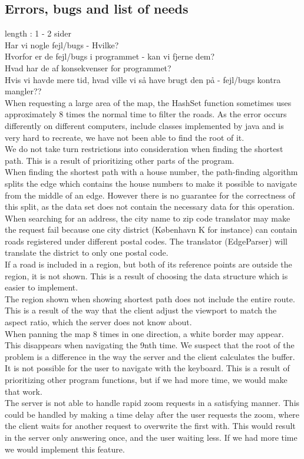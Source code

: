 \documentclass[a4paper,10pt,titlepage]{article}
\begin{document}
		\subsection{Errors, bugs and list of needs}
			length : 1 - 2 sider\\
			Har vi nogle fejl/bugs - Hvilke?\\
			Hvorfor er de fejl/bugs i programmet - kan vi fjerne dem?\\
			Hvad har de af konsekvenser for programmet?\\
			Hvis vi havde mere tid, hvad ville vi så have brugt den på - fejl/bugs kontra mangler??\\
When requesting a large area of the map, the HashSet function sometimes uses approximately 8 times the normal time to filter the roads. As the error occurs differently on different computers, include classes implemented by java and is very hard to recreate, we have not been able to find the root of it.
\\
We do not take turn restrictions into consideration when finding the shortest path. This is a result of prioritizing other parts of the program.
\\
When finding the shortest path with a house number, the path-finding algorithm splits the edge which contains the house numbers to make it possible to navigate from the middle of an edge. However there is no guarantee for the correctness of this split, as the data set does not contain the necessary data for this operation.
\\
When searching for an address, the city name to zip code translator may make the request fail because one city district (København K for instance) can contain roads registered under different postal codes. The translator (EdgeParser) will translate the district to only one postal code.
\\
If a road is included in a region, but both of its reference points are outside the region, it is not shown. This is a result of choosing the data structure which is easier to implement.
\\
The region shown when showing shortest path does not include the entire route. This is a result of the way that the client adjust the viewport to match the aspect ratio, which the server does not know about.
\\
When panning the map 8 times in one direction, a white border may appear. This disappears when navigating the 9nth time. We suspect that the root of the problem is a difference in the way the server and the client calculates the buffer.
\\
It is not possible for the user to navigate with the keyboard. This is a result of prioritizing other program functions, but if we had more time, we would make that work.
\\
The server is not able to handle rapid zoom requests in a satisfying manner. This could be handled by making a time delay after the user requests the zoom, where the client waits for another request to overwrite the first with. This would result in the server only answering once, and the user waiting less. If we had more time we would implement this feature.
\\
\end{document}
